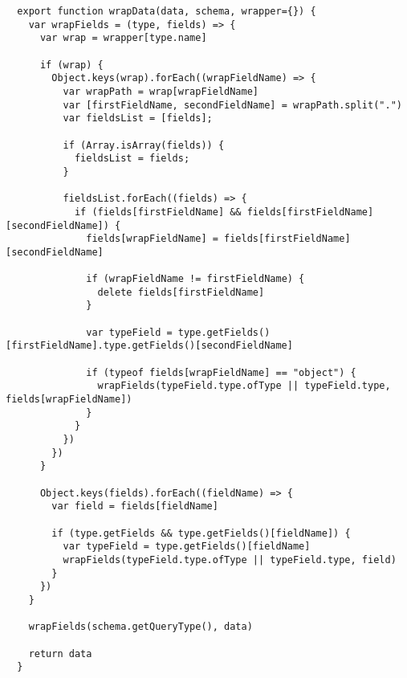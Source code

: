 \begin{verbatim}
  export function wrapData(data, schema, wrapper={}) {
    var wrapFields = (type, fields) => {
      var wrap = wrapper[type.name]

      if (wrap) {
        Object.keys(wrap).forEach((wrapFieldName) => {
          var wrapPath = wrap[wrapFieldName]
          var [firstFieldName, secondFieldName] = wrapPath.split(".")
          var fieldsList = [fields];

          if (Array.isArray(fields)) {
            fieldsList = fields;
          }

          fieldsList.forEach((fields) => {
            if (fields[firstFieldName] && fields[firstFieldName][secondFieldName]) {
              fields[wrapFieldName] = fields[firstFieldName][secondFieldName]

              if (wrapFieldName != firstFieldName) {
                delete fields[firstFieldName]
              }

              var typeField = type.getFields()[firstFieldName].type.getFields()[secondFieldName]

              if (typeof fields[wrapFieldName] == "object") {
                wrapFields(typeField.type.ofType || typeField.type, fields[wrapFieldName])
              }
            }
          })
        })
      }

      Object.keys(fields).forEach((fieldName) => {
        var field = fields[fieldName]

        if (type.getFields && type.getFields()[fieldName]) {
          var typeField = type.getFields()[fieldName]
          wrapFields(typeField.type.ofType || typeField.type, field)
        }
      })
    }

    wrapFields(schema.getQueryType(), data)

    return data
  }
\end{verbatim}
